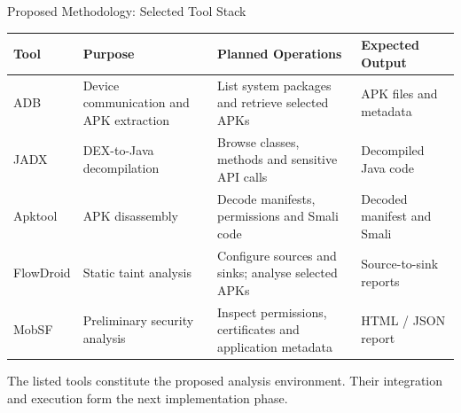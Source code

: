 \documentclass[aspectratio=169,10pt]{beamer}
\newcommand{\tbl}{\footnotesize\setlength{\tabcolsep}{3pt}\renewcommand{\arraystretch}{1.3}}
\begin{document}
\begin{frame}{Proposed Methodology: Selected Tool Stack}

\begin{table}
\centering
\tbl

\begin{tabular}{|L{.11}|L{.20}|L{.37}|L{.24}|}
\hline

\textbf{Tool} &
\textbf{Purpose} &
\textbf{Planned Operations} &
\textbf{Expected Output}\\
\hline

ADB &
Device communication and APK extraction &
List system packages and retrieve selected APKs &
APK files and metadata\\
\hline

JADX &
DEX-to-Java decompilation &
Browse classes, methods and sensitive API calls &
Decompiled Java code\\
\hline

Apktool &
APK disassembly &
Decode manifests, permissions and Smali code &
Decoded manifest and Smali\\
\hline

FlowDroid &
Static taint analysis &
Configure sources and sinks; analyse selected APKs &
Source-to-sink reports\\
\hline

MobSF &
Preliminary security analysis &
Inspect permissions, certificates and application metadata &
HTML / JSON report\\
\hline

\end{tabular}
\end{table}

\vspace{3pt}

\footnotesize
The listed tools constitute the proposed analysis environment. Their integration and execution form the next implementation phase.

\end{frame}

\end{document}
